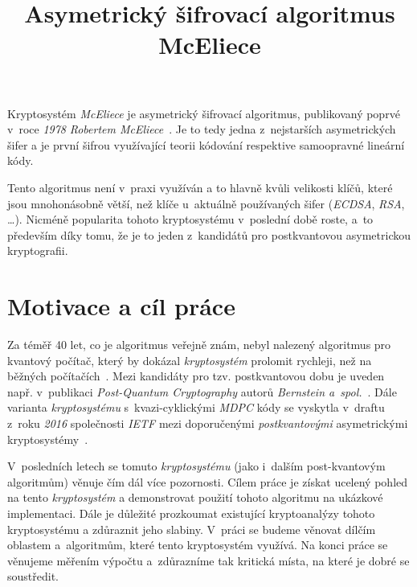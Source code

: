 \documentclass[thesis=M,czech,hidelinks]{FITthesis}[2012/06/26]
\title{Asymetrický šifrovací algoritmus McEliece}
\newcommand{\0}{{\textcolor[gray]{0.75}{0}}}
\begin{document}
\begin{introduction}

Kryptosystém \emph{McEliece} je asymetrický šifrovací algoritmus, publikovaný
poprvé v~roce \emph{1978} \emph{Robertem McEliece}~\cite{McEliece}. Je to tedy
jedna z~nejstarších asymetrických šifer a je první šifrou využívající teorii
kódování respektive samoopravné lineární kódy.

Tento algoritmus není v~praxi využíván a to hlavně kvůli velikosti klíčů, které
jsou mnohonásobně větší, než klíče u~aktuálně používaných šifer (\emph{ECDSA},
\emph{RSA}, \ldots). Nicméně popularita tohoto kryptosystému v~poslední době
roste, a~to především díky tomu, že je to jeden z~kandidátů pro postkvantovou
asymetrickou kryptografii.


\section*{Motivace a cíl práce}

Za téměř 40 let, co je algoritmus veřejně znám, nebyl nalezený algoritmus pro
kvantový počítač, který by dokázal \emph{kryptosystém} prolomit rychleji, než na
běžných počítačích~\cite{Dinh}. Mezi kandidáty pro tzv. postkvantovou dobu je
uveden např. v~publikaci \emph{Post-Quantum Cryptography} autorů \emph{Bernstein
a~spol.}~\cite{Post-Quantum_Cryptography}. Dále varianta \emph{kryptosystému}
s~kvazi-cyklickými \emph{MDPC} kódy se vyskytla v~draftu z~roku \emph{2016}
společnosti \emph{IETF} mezi doporučenými \emph{postkvantovými} asymetrickými
kryptosystémy~\cite{Schanck}.

V~posledních letech se tomuto \emph{kryptosystému} (jako i~dalším post-kvantovým
algoritmům) věnuje čím dál více pozornosti. Cílem práce je získat ucelený pohled
na tento \emph{kryptosystém} a demonstrovat použití tohoto algoritmu na ukázkové
implementaci. Dále je důležité prozkoumat existující kryptoanalýzy tohoto
kryptosystému a zdůraznit jeho slabiny. V~práci se budeme věnovat dílčím
oblastem a~algoritmům, které tento kryptosystém využívá. Na konci práce se
věnujeme měřením výpočtu a~zdůrazníme tak kritická místa, na které je dobré se
soustředit.



\end{introduction}
\end{document}
